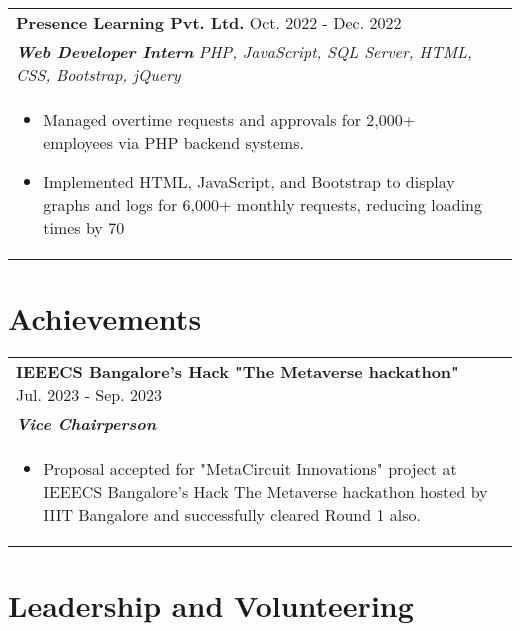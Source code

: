 \documentclass[a4paper,8pt]{article}
\begin{document}
\begin{tabularx}{\linewidth}{ @{}l r@{} }
\color[HTML]{1C033C} \textbf{Presence Learning Pvt. Ltd.} \hfill \color[HTML]{371e77}Oct. 2022 - Dec. 2022 \\[4pt]
\color[HTML]{371e77}\textbf{\textit{Web Developer Intern}} \hfill \color[HTML]{4B28A4} \textit{PHP, JavaScript, SQL Server, HTML, CSS, Bootstrap, jQuery} \\[5pt]
\begin{minipage}[t]{\linewidth}
    \begin{itemize}[nosep,after=\strut, leftmargin=2em, itemsep=2pt]
        \item Managed overtime requests and approvals for 2,000+ employees via PHP backend systems.
        \item Implemented HTML, JavaScript, and Bootstrap to display graphs and logs for 6,000+ monthly requests, reducing loading times by 70%
    \end{itemize}
\end{minipage}
\end{tabularx}

\vspace{-5pt} %

\section{Achievements}

\begin{tabularx}{\linewidth}{ @{}l r@{} }
\color[HTML]{1C033C} \textbf{ IEEECS Bangalore's Hack "The Metaverse hackathon"} \hfill \color[HTML]{371e77} Jul. 2023 - Sep. 2023 \\[3pt]
\color[HTML]{371e77}\textbf{\textit{Vice Chairperson}} \\[3pt]
\begin{minipage}[t]{\linewidth}
    \begin{itemize}[nosep,after=\strut, leftmargin=2em, itemsep=2pt]
        \item Proposal accepted for "MetaCircuit Innovations" project at IEEECS Bangalore's Hack The Metaverse hackathon hosted by IIIT Bangalore and successfully cleared Round 1 also.
    \end{itemize}
\end{minipage}
\end{tabularx}


\section{Leadership and Volunteering}
\end{document}

